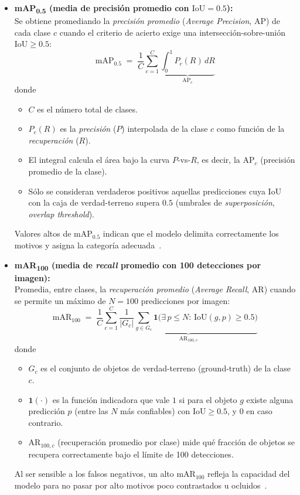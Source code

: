 \begin{itemize}
    \item \textbf{mAP\textsubscript{0.5} (media de precisión promedio con $\text{IoU}=0.5$):}\\[2pt]
      Se obtiene promediando la \emph{precisión promedio} (\textit{Average Precision}, $\mathrm{AP}$) de cada clase $c$ cuando el criterio de acierto exige una intersección-sobre-unión $\text{IoU}\ge 0.5$:
      \[
      \text{mAP}_{0.5}
      \;=\;
      \frac{1}{C}\sum_{c=1}^{C}
      \underbrace{\int_{0}^{1} P_c(R)\,dR}_{\mathrm{AP}_c}
      \]
      donde
      \begin{itemize}
        \item $C$ es el número total de clases.
        \item $P_c(R)$ es la \textit{precisión} ($P$) interpolada de la clase $c$ como función de la \textit{recuperación} ($R$).
        \item El integral calcula el área bajo la curva $P$-vs-$R$, es decir, la $\mathrm{AP}_c$ (precisión promedio de la clase).
        \item Sólo se consideran verdaderos positivos aquellas predicciones cuya $\text{IoU}$ con la caja de verdad-terreno supera $0.5$ (umbrales de \textit{superposición}, \emph{overlap threshold}).
      \end{itemize}
      Valores altos de $\text{mAP}_{0.5}$ indican que el modelo delimita correctamente los motivos y asigna la categoría adecuada~\cite{lin2014microsoft,everingham2010pascal}.

    \item \textbf{mAR\textsubscript{100} (media de \emph{recall} promedio con 100 detecciones por imagen):}\\[2pt]
      Promedia, entre clases, la \emph{recuperación promedio} (\textit{Average Recall}, $\mathrm{AR}$) cuando se permite un máximo de $N=100$ predicciones por imagen:
      \[
      \text{mAR}_{100}
      \;=\;
      \frac{1}{C}\sum_{c=1}^{C}
      \underbrace{\frac{1}{|G_c|}
      \sum_{g\in G_c}\!
      \mathbf{1}\bigl(
          \exists\,p\le N:\,\text{IoU}(g,p)\ge 0.5
      \bigr)}_{\mathrm{AR}_{100,c}}
      \]
      donde
      \begin{itemize}
        \item $G_c$ es el conjunto de objetos de verdad-terreno (ground-truth) de la clase $c$.
        \item $\mathbf{1}(\cdot)$ es la función indicadora que vale $1$ si para el objeto $g$ existe alguna predicción $p$ (entre las $N$ más confiables) con $\text{IoU}\ge 0.5$, y $0$ en caso contrario.
        \item $\mathrm{AR}_{100,c}$ (recuperación promedio por clase) mide qué fracción de objetos se recupera correctamente bajo el límite de 100 detecciones.
      \end{itemize}
      Al ser sensible a los falsos negativos, un alto $\text{mAR}_{100}$ refleja la capacidad del modelo para no pasar por alto motivos poco contrastados u ocluidos~\cite{cocoEval2015}.
\end{itemize}


